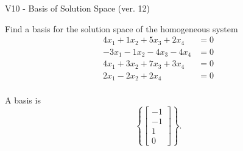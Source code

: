\begin{exercise}
  \begin{exerciseTitle}V10 - Basis of Solution Space (ver. 12)\end{exerciseTitle}
  \begin{exerciseStatement}
    Find a basis for the solution space of the homogeneous system 
\begin{align*}
 4 x_ 1 + 1 x_ 2 + 5 x_ 3 + 2 x_ 4 &= 0  \\ 
  -3 x_ 1 -1 x_ 2 -4 x_ 3 -4 x_ 4 &= 0  \\ 
  4 x_ 1 + 3 x_ 2 + 7 x_ 3 + 3 x_ 4 &= 0  \\ 
  2 x_ 1 -2 x_ 2 + 2 x_ 4 &= 0  \\ 
 \end{align*}


 
  \end{exerciseStatement}

  \begin{exerciseAnswer}
   A basis is   
\[\left\{\left[\begin{array}{c}
-1 \\
-1 \\
1 \\
0
\end{array}\right]\right\}.\]

  


  \end{exerciseAnswer}
\end{exercise}